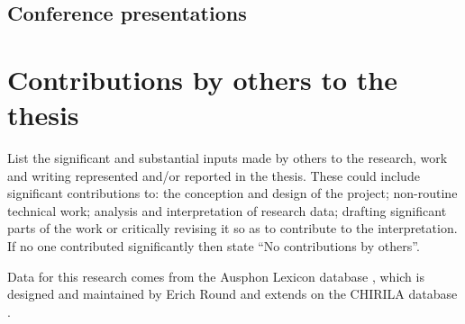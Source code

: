 
\nocite{round_automated_2020}
\printbibliography[keyword={post2016_publication},heading=none]

\subsection*{Conference presentations}

\nocite{macklin-cordes_zipfs_2020,
        macklin-cordes_historical_2019,
        round_clouded_2019,
        macklin-cordes_phylogeny_2018,
        macklin-cordes_robots_2017,
        macklin-cordes_fine-grained_2017,
        macklin-cordes_high-definition_2017,
        macklin-cordes_evaluating_2016,
        hollis_cape_2016,
        macklin-cordes_reflections_2016,
        round_grammar_2016,
        macklin-cordes_high-definition_2016,
        macklin-cordes_high-definition_2016-1}
\printbibliography[keyword={post2016_conference},heading=none]



\section*{Contributions by others to the thesis}

\begin{instructional}
	List the significant and substantial inputs made by others to the research, work and writing represented and/or reported in the thesis. These could include significant contributions to: the conception and design of the project; non-routine technical work; analysis and interpretation of research data; drafting significant parts of the work or critically revising it so as to contribute to the interpretation. \\
    
    \noindent
	If no one contributed significantly then state ``No contributions by others''.
\end{instructional}


\noindent
Data for this research comes from the Ausphon Lexicon database \autocite{round_ausphon-lexicon_2017}, which is designed and maintained by Erich Round and extends on the CHIRILA database \autocite{bowern_chirila_2016}.\\

